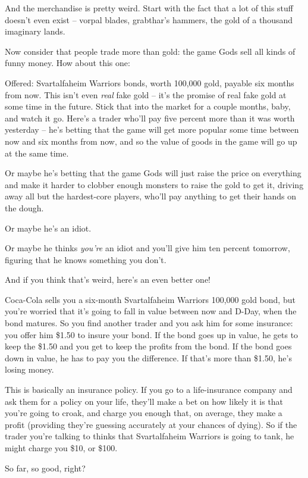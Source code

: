 And the merchandise is pretty weird. Start with the fact that a lot
of this stuff doesn't even exist -- vorpal blades, grabthar's
hammers, the gold of a thousand imaginary lands.

Now consider that people trade more than gold: the game Gods sell
all kinds of funny money. How about this one:

Offered: Svartalfaheim Warriors bonds, worth 100,000 gold, payable
six months from now. This isn't even \emph{real} fake gold -- it's
the promise of real fake gold at some time in the future. Stick
that into the market for a couple months, baby, and watch it go.
Here's a trader who'll pay five percent more than it was worth
yesterday -- he's betting that the game will get more popular some
time between now and six months from now, and so the value of goods
in the game will go up at the same time.

Or maybe he's betting that the game Gods will just raise the price
on everything and make it harder to clobber enough monsters to
raise the gold to get it, driving away all but the hardest-core
players, who'll pay anything to get their hands on the dough.

Or maybe he's an idiot.

Or maybe he thinks \emph{you're} an idiot and you'll give him ten
percent tomorrow, figuring that he knows something you don't.

And if you think that's weird, here's an even better one!

Coca-Cola sells you a six-month Svartalfaheim Warriors 100,000 gold
bond, but you're worried that it's going to fall in value between
now and D-Day, when the bond matures. So you find another trader
and you ask him for some insurance: you offer him \$1.50 to insure
your bond. If the bond goes up in value, he gets to keep the \$1.50
and you get to keep the profits from the bond. If the bond goes
down in value, he has to pay you the difference. If that's more
than \$1.50, he's losing money.

This is basically an insurance policy. If you go to a
life-insurance company and ask them for a policy on your life,
they'll make a bet on how likely it is that you're going to croak,
and charge you enough that, on average, they make a profit
(providing they're guessing accurately at your chances of dying).
So if the trader you're talking to thinks that Svartalfaheim
Warriors is going to tank, he might charge you \$10, or \$100.

So far, so good, right?

